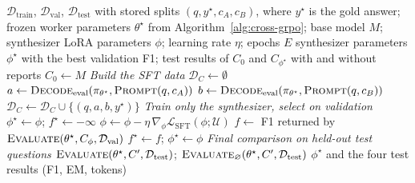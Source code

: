 \documentclass[11pt]{article}
\begin{document}
\begin{algorithm}[htbp]
\caption{Supervised fine-tuning of the synthesizer with frozen workers}
\label{alg:sft-c}
\begin{algorithmic}[1]
\Require $\mathcal{D}_{\mathrm{train}}$, $\mathcal{D}_{\mathrm{val}}$,
  $\mathcal{D}_{\mathrm{test}}$ with stored splits $(q, y^\star, c_A, c_B)$,
  where $y^\star$ is the gold answer; frozen worker parameters $\theta^\star$
  from Algorithm~\ref{alg:cross-grpo}; base model $M$; synthesizer LoRA
  parameters $\phi$; learning rate $\eta$; epochs $E$
\Ensure synthesizer parameters $\phi^\star$ with the best validation F1;
  test results of $C_0$ and $C_{\phi^\star}$ with and without reports
\State $C_0 \gets M$ 
\Statex \textit{Build the SFT data}
\State $\mathcal{D}_C \gets \emptyset$
  \State $a \gets \textsc{Decode}_{\mathrm{eval}}(\pi_{\theta^\star}, \textsc{Prompt}(q, c_A))$
  \State $b \gets \textsc{Decode}_{\mathrm{eval}}(\pi_{\theta^\star}, \textsc{Prompt}(q, c_B))$
  \State $\mathcal{D}_C \gets \mathcal{D}_C \cup \{(q, a, b, y^\star)\}$
\EndFor
\Statex \textit{Train only the synthesizer, select on validation}
\State $\phi^\star \gets \phi$; \; $f^\star \gets -\infty$
    \State $\phi \gets \phi - \eta\, \nabla_\phi \mathcal{L}_{\mathrm{SFT}}(\phi; \mathcal{U})$
  \EndFor
  \State $f \gets$ F1 returned by $\Call{Evaluate}{\theta^\star, C_\phi, \mathcal{D}_{\mathrm{val}}}$
    \State $f^\star \gets f$; \; $\phi^\star \gets \phi$
  \EndIf
\EndFor
\Statex \textit{Final comparison on held-out test questions}
  \State $\Call{Evaluate}{\theta^\star, C', \mathcal{D}_{\mathrm{test}}}$; \;
    $\textsc{Evaluate}_{\varnothing}(\theta^\star, C', \mathcal{D}_{\mathrm{test}})$
\EndFor
\State \Return $\phi^\star$ and the four test results (F1, EM, tokens)
\end{algorithmic}
\end{algorithm}
\end{document}
